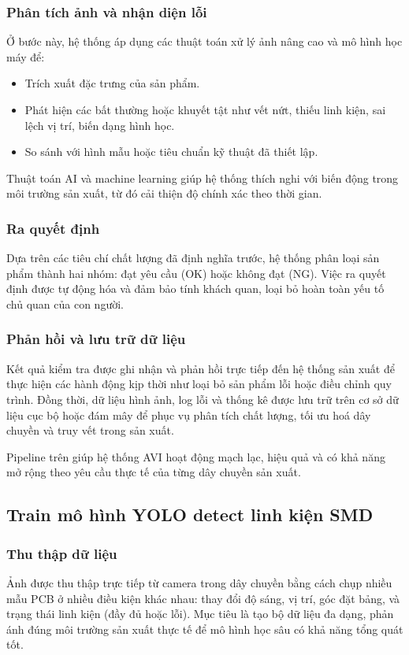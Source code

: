 \subsubsection{Phân tích ảnh và nhận diện lỗi}
Ở bước này, hệ thống áp dụng các thuật toán xử lý ảnh nâng cao và mô hình học máy để:
\begin{itemize}
    \item Trích xuất đặc trưng của sản phẩm.
    \item Phát hiện các bất thường hoặc khuyết tật như vết nứt, thiếu linh kiện, sai lệch vị trí, biến dạng hình học.
    \item So sánh với hình mẫu hoặc tiêu chuẩn kỹ thuật đã thiết lập.
\end{itemize}
Thuật toán AI và machine learning giúp hệ thống thích nghi với biến động trong môi trường sản xuất, từ đó cải thiện độ chính xác theo thời gian.

\subsubsection{Ra quyết định}
Dựa trên các tiêu chí chất lượng đã định nghĩa trước, hệ thống phân loại sản phẩm thành hai nhóm: đạt yêu cầu (OK) hoặc không đạt (NG). Việc ra quyết định được tự động hóa và đảm bảo tính khách quan, loại bỏ hoàn toàn yếu tố chủ quan của con người.

\subsubsection{Phản hồi và lưu trữ dữ liệu}
Kết quả kiểm tra được ghi nhận và phản hồi trực tiếp đến hệ thống sản xuất để thực hiện các hành động kịp thời như loại bỏ sản phẩm lỗi hoặc điều chỉnh quy trình. Đồng thời, dữ liệu hình ảnh, log lỗi và thống kê được lưu trữ trên cơ sở dữ liệu cục bộ hoặc đám mây để phục vụ phân tích chất lượng, tối ưu hoá dây chuyền và truy vết trong sản xuất.

Pipeline trên giúp hệ thống AVI hoạt động mạch lạc, hiệu quả và có khả năng mở rộng theo yêu cầu thực tế của từng dây chuyền sản xuất.

\subsection{Train mô hình YOLO detect linh kiện SMD}

\subsubsection{Thu thập dữ liệu}
Ảnh được thu thập trực tiếp từ camera trong dây chuyền bằng cách chụp nhiều mẫu PCB ở nhiều điều kiện khác nhau: thay đổi độ sáng, vị trí, góc đặt bảng, và trạng thái linh kiện (đầy đủ hoặc lỗi). Mục tiêu là tạo bộ dữ liệu đa dạng, phản ánh đúng môi trường sản xuất thực tế để mô hình học sâu có khả năng tổng quát tốt.

